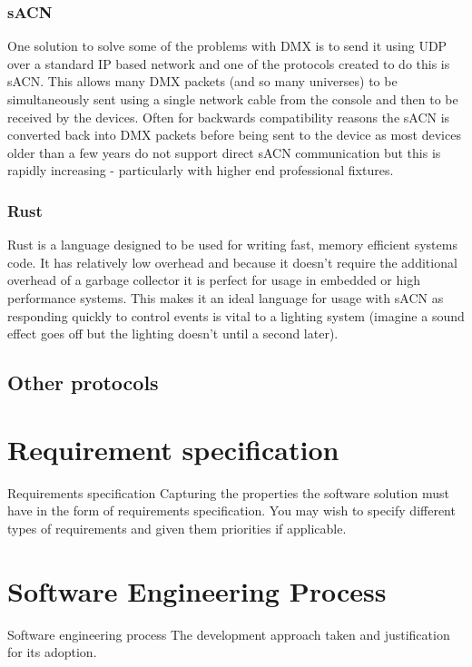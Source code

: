 \documentclass[11pt,a4paper,notitlepage]{report}
\begin{document}
	\subsubsection*{sACN}
	One solution to solve some of the problems with DMX is to send it using UDP over a standard IP based network and one of the protocols created to do this is sACN. This allows many DMX packets (and so many universes) to be simultaneously sent using a single network cable from the console and then to be received by the devices. Often for backwards compatibility reasons the sACN is converted back into DMX packets before being sent to the device as most devices older than a few years do not support direct sACN communication but this is rapidly increasing - particularly with higher end professional fixtures. 
	
	\subsubsection*{Rust}
	Rust \cite{RUST_LANG} is a language designed to be used for writing fast, memory efficient systems code. It has relatively low overhead and because it doesn't require the additional overhead of a garbage collector it is perfect for usage in embedded or high performance systems. This makes it an ideal language for usage with sACN as responding quickly to control events is vital to a lighting system (imagine a sound effect goes off but the lighting doesn't until a second later). 
	
	\subsection{Other protocols}
	
	\section{Requirement specification}
	Requirements
	specification
	Capturing the properties the software solution must
	have in the form of requirements specification. You
	may wish to specify different types of requirements and
	given them priorities if applicable.
	
	\section{Software Engineering Process}
		Software
	engineering
	process
	The development approach taken and justification for
	its adoption.
\end{document}
